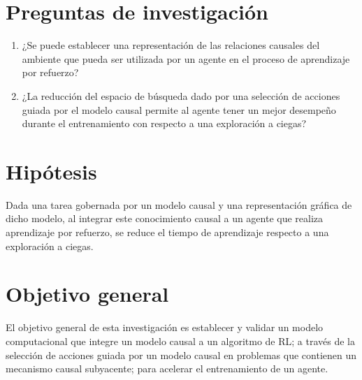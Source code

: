 
\section{Preguntas de investigación}

\begin{enumerate}
    \item ¿Se puede establecer una representación de las relaciones causales
del ambiente que pueda ser utilizada por un agente en el proceso
de aprendizaje por refuerzo?
    \item ¿La reducción del espacio de búsqueda dado por una selección de acciones guiada por el modelo causal permite al agente tener un mejor desempeño durante el entrenamiento con respecto a una exploración a ciegas?
\end{enumerate}
\section{Hipótesis}



Dada una tarea gobernada por un modelo causal y una representación
gráfica de dicho modelo, al integrar este conocimiento causal
a un agente que realiza aprendizaje por refuerzo, se reduce
el tiempo de aprendizaje respecto a una exploración a ciegas.

\section{Objetivo general}
El objetivo general de esta investigación
es establecer y validar un modelo computacional que integre 
un modelo causal a un algoritmo de RL; a través de
la selección de acciones guiada por un 
modelo causal en problemas que contienen
un mecanismo causal subyacente; para acelerar el entrenamiento de un agente.
